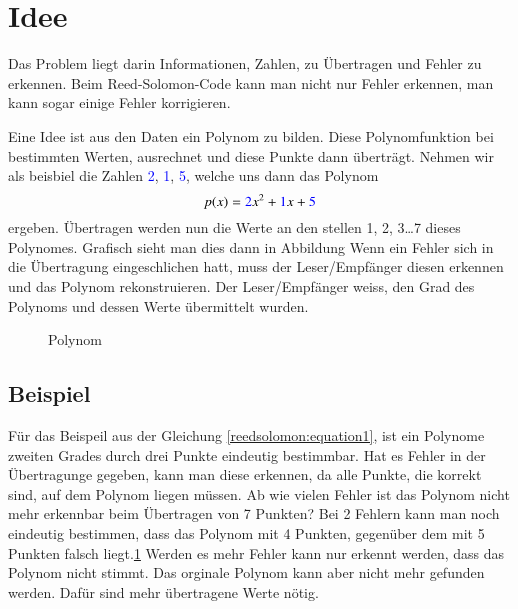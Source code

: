 %
%
%
\section{Idee
\label{reedsolomon:section:idee}}
Das Problem liegt darin Informationen, Zahlen, 
zu Übertragen und Fehler zu erkennen.
Beim Reed-Solomon-Code kann man nicht nur Fehler erkennen, 
man kann sogar einige Fehler korrigieren.

Eine Idee ist aus den Daten 
ein Polynom zu bilden.
Diese Polynomfunktion bei bestimmten Werten, ausrechnet und diese Punkte dann überträgt.
Nehmen wir als beisbiel die Zahlen \textcolor{blue}{2}, \textcolor{blue}{1}, \textcolor{blue}{5},
welche uns dann das Polynom 
\begin{equation}
p(x)
=
\textcolor{blue}{2}x^2 + \textcolor{blue}{1}x + \textcolor{blue}{5}
\label{reedsolomon:equation1}
\end{equation}
ergeben.
Übertragen werden nun die Werte an den stellen 1, 2, 3\dots 7 dieses Polynomes.
Grafisch sieht man dies dann in Abbildung 
Wenn ein Fehler sich in die Übertragung eingeschlichen hatt, muss der Leser/Empfänger diesen erkennen und das Polynom rekonstruieren.
Der Leser/Empfänger weiss, den Grad des Polynoms und dessen Werte übermittelt wurden. 

\begin{figure}
	\centering
	\caption{Polynom }
	\label{fig:polynom}
\end{figure}

\subsection{Beispiel}
Für das Beispeil aus der Gleichung \eqref{reedsolomon:equation1},
ist ein Polynome zweiten Grades durch drei Punkte eindeutig bestimmbar.
Hat es Fehler in der Übertragunge gegeben, kann man diese erkennen,
da alle Punkte, die korrekt sind, auf dem Polynom liegen müssen.
Ab wie vielen Fehler ist das Polynom nicht mehr erkennbar beim Übertragen von 7 Punkten?
Bei 2 Fehlern kann man noch eindeutig bestimmen, dass das Polynom mit 4 Punkten,
gegenüber dem mit 5 Punkten falsch liegt.\ref{fig:polynom}
Werden es mehr Fehler kann nur erkennt werden, dass das Polynom nicht stimmt.
Das orginale Polynom kann aber nicht mehr gefunden werden.
Dafür sind mehr übertragene Werte nötig.

